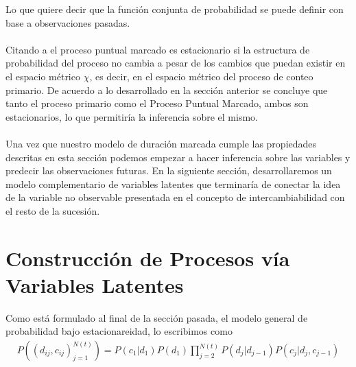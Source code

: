 Lo que quiere decir que la funci\'on conjunta de probabilidad se puede definir con base a observaciones pasadas.\\
\\
Citando a \cite{daley2003} el proceso puntual marcado es estacionario si la estructura de probabilidad del proceso no cambia a pesar de los cambios que puedan existir en el espacio m\'etrico $\chi$, es decir, en el espacio m\'etrico del proceso de conteo primario. De acuerdo a lo desarrollado en la secci\'on anterior se concluye que tanto el proceso primario como el Proceso Puntual Marcado, ambos son estacionarios, lo que permitir\'ia la inferencia sobre el mismo.\\
\\
Una vez que nuestro modelo de duraci\'on marcada cumple las propiedades descritas en esta secci\'on podemos empezar a hacer inferencia sobre las variables y predecir las observaciones futuras. En la siguiente secci\'on, desarrollaremos un modelo complementario de variables latentes que terminar\'ia de conectar la idea de la variable no observable presentada en el concepto de intercambiabilidad con el resto de la sucesi\'on.

\section{Construcci\'on de Procesos v\'ia Variables Latentes}
Como est\'a formulado al final de la secci\'on pasada, el modelo general de probabilidad bajo estacionareidad, lo escribimos como
\begin{align*}
P((d_{ij},c_{ij})_{j=1}^{N(t)})= P(c_1|d_1)P(d_1) \prod_{j=2}^{N(t)} P(d_j|d_{j-1})P(c_j|d_j,c_{j-1})
\end{align*}

